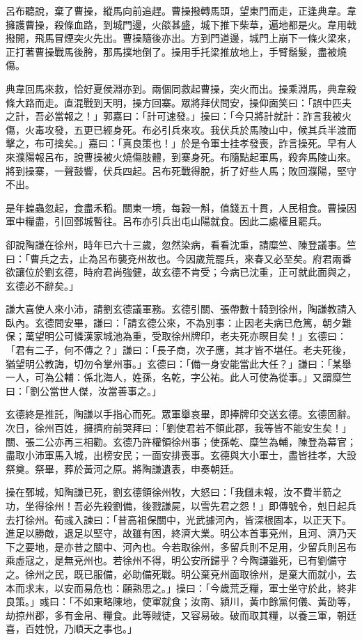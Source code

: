 呂布聽說，棄了曹操，縱馬向前追趕。曹操撥轉馬頭，望東門而走，正逢典韋。韋擁護曹操，殺條血路，到城門邊，火燄甚盛，城下推下柴草，遍地都是火。韋用戟撥開，飛馬冒煙突火先出。曹操隨後亦出。方到門道邊，城門上崩下一條火梁來，正打著曹操戰馬後胯，那馬撲地倒了。操用手托梁推放地上，手臂鬚髮，盡被燒傷。

典韋回馬來救，恰好夏侯淵亦到。兩個同救起曹操，突火而出。操乘淵馬，典韋殺條大路而走。直混戰到天明，操方回寨。眾將拜伏問安，操仰面笑曰：「誤中匹夫之計，吾必當報之！」郭嘉曰：「計可速發。」操曰：「今只將計就計：詐言我被火傷，火毒攻發，五更已經身死。布必引兵來攻。我伏兵於馬陵山中，候其兵半渡而擊之，布可擒矣。」嘉曰：「真良策也！」於是令軍士挂孝發喪，詐言操死。早有人來濮陽報呂布，說曹操被火燒傷肢體，到寨身死。布隨點起軍馬，殺奔馬陵山來。將到操寨，一聲鼓響，伏兵四起。呂布死戰得脫，折了好些人馬；敗回濮陽，堅守不出。

是年蝗蟲忽起，食盡禾稻。關東一境，每榖一斛，值錢五十貫，人民相食。曹操因軍中糧盡，引回鄄城暫往。呂布亦引兵出屯山陽就食。因此二處權且罷兵。

卻說陶謙在徐州，時年已六十三歲，忽然染病，看看沈重，請糜竺、陳登議事。竺曰：「曹兵之去，止為呂布襲兗州故也。今因歲荒罷兵，來春又必至矣。府君兩番欲讓位於劉玄德，時府君尚強健，故玄德不肯受；今病已沈重，正可就此面與之，玄德必不辭矣。」

謙大喜使人來小沛，請劉玄德議軍務。玄德引關、張帶數十騎到徐州，陶謙教請入臥內。玄德問安畢，謙曰：「請玄德公來，不為別事：止因老夫病已危篤，朝夕難保；萬望明公可憐漢家城池為重，受取徐州牌印，老夫死亦瞑目矣！」玄德曰：「君有二子，何不傳之？」謙曰：「長子商，次子應，其才皆不堪任。老夫死後，猶望明公教誨，切勿令掌州事。」玄德曰：「備一身安能當此大任？」謙曰：「某舉一人，可為公輔：係北海人，姓孫，名乾，字公祐。此人可使為從事。」又謂糜竺曰：「劉公當世人傑，汝當善事之。」

玄德終是推託，陶謙以手指心而死。眾軍舉哀畢，即捧牌印交送玄德。玄德固辭。次日，徐州百姓，擁擠府前哭拜曰：「劉使君若不領此郡，我等皆不能安生矣！」關、張二公亦再三相勸。玄德乃許權領徐州事；使孫乾、糜竺為輔，陳登為幕官；盡取小沛軍馬入城，出榜安民；一面安排喪事。玄德與大小軍士，盡皆挂孝，大設祭奠。祭畢，葬於黃河之原。將陶謙遺表，申奏朝廷。

操在鄄城，知陶謙已死，劉玄德領徐州牧，大怒曰：「我讎未報，汝不費半箭之功，坐得徐州！吾必先殺劉備，後戮謙屍，以雪先君之怨！」即傳號令，剋日起兵去打徐州。荀彧入諫曰：「昔高祖保關中，光武據河內，皆深根固本，以正天下。進足以勝敵，退足以堅守，故雖有困，終濟大業。明公本首事兗州，且河、濟乃天下之要地，是亦昔之關中、河內也。今若取徐州，多留兵則不足用，少留兵則呂布乘虛寇之，是無兗州也。若徐州不得，明公安所歸乎？今陶謙雖死，已有劉備守之。徐州之民，既已服備，必助備死戰。明公棄兗州面取徐州，是棄大而就小，去本而求末，以安而易危也：願熟思之。」操曰：「今歲荒乏糧，軍士坐守於此，終非良策。」彧曰：「不如東略陳地，使軍就食；汝南、潁川，黃巾餘黨何儀、黃劭等，劫掠州郡，多有金帛、糧食。此等賊徒，又容易破。破而取其糧，以養三軍，朝廷喜，百姓悅，乃順天之事也。」

